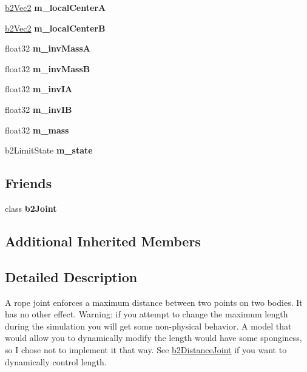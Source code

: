\begin{DoxyCompactItemize}
\mbox{\label{classb2RopeJoint_a15ff1472deb6405c9886a40ee99efcef}} 
\mbox{\hyperlink{structb2Vec2}{b2\+Vec2}} {\bfseries m\+\_\+local\+CenterA}
\item 
\mbox{\label{classb2RopeJoint_a2b3b1ac9ae9e3e68b2550809ec178877}} 
\mbox{\hyperlink{structb2Vec2}{b2\+Vec2}} {\bfseries m\+\_\+local\+CenterB}
\item 
\mbox{\label{classb2RopeJoint_a690e4fe5ab7a279accac3b137d5f5c76}} 
float32 {\bfseries m\+\_\+inv\+MassA}
\item 
\mbox{\label{classb2RopeJoint_a9709179725abed80d4957df82bc24512}} 
float32 {\bfseries m\+\_\+inv\+MassB}
\item 
\mbox{\label{classb2RopeJoint_a1917a65b89668c433d06071970a6875a}} 
float32 {\bfseries m\+\_\+inv\+IA}
\item 
\mbox{\label{classb2RopeJoint_a1ce440194cec6e275193d7224ce1e448}} 
float32 {\bfseries m\+\_\+inv\+IB}
\item 
\mbox{\label{classb2RopeJoint_a1f355a976b177b75a8fd47190194d5c1}} 
float32 {\bfseries m\+\_\+mass}
\item 
\mbox{\label{classb2RopeJoint_ac73c9451360c80c8a98376b922f4bed4}} 
b2\+Limit\+State {\bfseries m\+\_\+state}
\end{DoxyCompactItemize}
\subsection*{Friends}
\begin{DoxyCompactItemize}
\item 
\mbox{\label{classb2RopeJoint_a54ade8ed3d794298108d7f4c4e4793fa}} 
class {\bfseries b2\+Joint}
\end{DoxyCompactItemize}
\subsection*{Additional Inherited Members}


\subsection{Detailed Description}
A rope joint enforces a maximum distance between two points on two bodies. It has no other effect. Warning\+: if you attempt to change the maximum length during the simulation you will get some non-\/physical behavior. A model that would allow you to dynamically modify the length would have some sponginess, so I chose not to implement it that way. See \mbox{\hyperlink{classb2DistanceJoint}{b2\+Distance\+Joint}} if you want to dynamically control length. 

